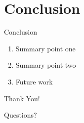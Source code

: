 \documentclass[aspectratio=169, 11pt]{beamer}
\begin{document}
\section{Conclusion}

\begin{frame}{Conclusion}
  \begin{enumerate}
    \item Summary point one
    \item Summary point two
    \item Future work
  \end{enumerate}
\end{frame}

\begin{frame}[plain]
  \centering
  \Huge Thank You!
  
  \vspace{1cm}
  \normalsize
  Questions?
\end{frame}
\end{document}
